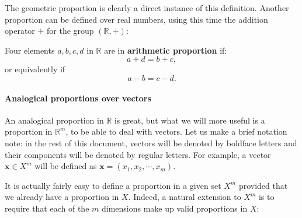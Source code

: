The geometric proportion is clearly a direct instance of this definition.
Another proportion can be defined over real numbers, using this time the
addition operator $+$ for the group $(\mathbb{R}, +)$:

\begin{definition}
  Four elements $a, b, c, d$ in $\mathbb{R}$ are in \textbf{arithmetic
  proportion} if:
  $$a + d = b + c,$$
  or equivalently if
  $$a - b = c - d.$$
\end{definition}

\paragraph{Analogical proportions over vectors\\}

An analogical proportion in $\mathbb{R}$ is great, but what we will more useful
is a proportion in $\mathbb{R}^m$, to be able to deal with vectors.  Let us
make a brief notation note: in the rest of this document, vectors will be
denoted by boldface letters and their components will be denoted by regular
letters. For example, a vector $\mathbf{x} \in X^m$ will be defined as
$\mathbf{x} = (x_1, x_2, \cdots, x_m)$.

It is actually fairly easy to define a proportion in a given set $X^m$ provided
that we already have a proportion in $X$. Indeed, a natural extension to $X^m$
is to require that each of the $m$ dimensions make up valid proportions in $X$:

